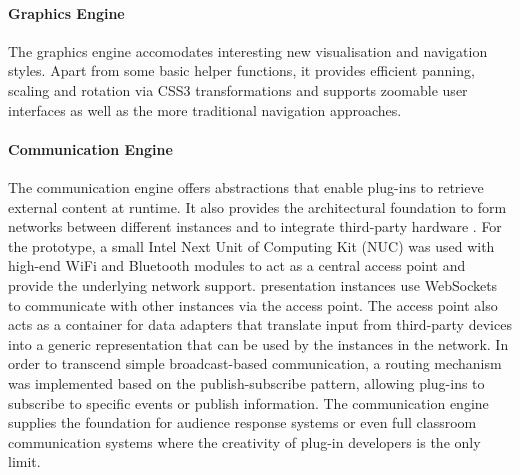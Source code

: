      \paragraph{Graphics Engine} The graphics engine accomodates interesting
      new visualisation and navigation styles. Apart from some basic helper
      functions, it provides efficient panning, scaling and rotation via CSS3
      transformations and supports zoomable user interfaces as well as the more
      traditional navigation approaches.

     \paragraph{Communication Engine} The communication engine offers
      abstractions that enable plug-ins to retrieve external content at runtime.
      It also provides the architectural foundation to form networks
      between different \mxp instances and to integrate third-party hardware
      \citep{roels-2}.
      For the \mxp prototype, a small Intel Next Unit
      of Computing Kit (NUC) was used with high-end WiFi and Bluetooth modules to act as
      a central access point and provide the underlying network support. \mxp presentation
      instances use WebSockets to communicate with other \mxp instances via the
      access point. The access point also acts as a container for data
      adapters that translate input from third-party devices
      into a generic representation that can be used by the \mxp instances in
      the network. In order to transcend simple broadcast-based communication,
      a routing mechanism was implemented based on the publish-subscribe
      pattern, allowing plug-ins to subscribe to specific events or publish
      information. The communication engine supplies the foundation for audience
      response systems \citep{roels-2} or even full classroom communication
      systems where the creativity of plug-in developers is the only limit.


